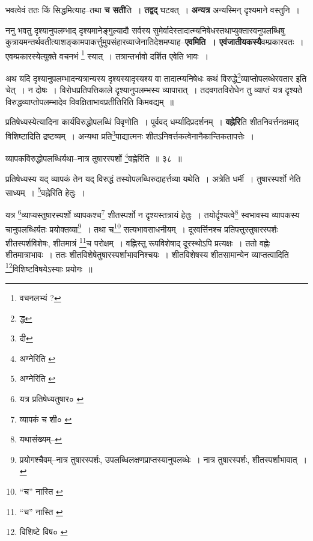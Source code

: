 \documentclass[article,12pt,a4paper]{memoir}
\begin{document}
	  \pstart भवत्वेवं ततः किं सिद्धमित्याह--तथा \textbf{च सती}ति । \textbf{तद्वद्} घटवत् । \textbf{अन्य}\leavevmode{}\textbf{त्र} अन्यस्मिन् दृश्यमाने वस्तुनि ।
	\pend
      

	  \pstart ननु भवतु दृश्यानुपलम्भाद् दृश्यमानेङ्गुल्यादौ सर्वस्य सुमेर्वादेस्तादात्म्यनिषेधस्तथाप्युक्तास्वनुपलब्धिषु कुत्रायमन्तर्थवतीत्याशङ्कामपाकर्त्तुमुपसंहारव्याजेनातिदेशमप्याह--\textbf{एवमिति । एवंजातीयकस्यै}वम्प्रकारवतः । एवम्प्रकारस्येत्युक्ते वचनभं \footnote{वचनलभ्यं ?} स्यात् । तत्रान्तर्भावो दर्शित एवेति भावः ।
	\pend
      

	  \pstart अथ यदि दृश्यानुपलम्भादन्यत्रान्यस्य दृश्यस्यादृस्यश्य वा तादात्म्यनिषेधः कथं विरुद्धे\footnote{द्ध}व्याप्तोपलब्धेरवतार इति चेत् । न दोषः । विरोधप्रतिपत्तिकाले दृश्यानुपलम्भस्य व्यापारात् । तदवगतविरोधेन तु व्याप्तं यत्र दृश्यते विरुद्धव्याप्तोपलम्भादेव विवक्षिताभावप्रतीतिरिति किमवद्यम् ॥
	\pend
      

	  \pstart प्रतिषेध्यस्येत्यादिना कार्यविरुद्धोपलब्धिं विवृणोति । पूर्ववद् धर्म्यादिप्रदर्शनम् । \textbf{वह्नेरि}ति शीतनिवर्त्तनक्षमाद् विशिष्टादिति द्रष्टव्यम् । अन्यथा प्रति\footnote{दी}पाद्यात्मनः शीतऽनिवर्त्तकत्वेनानैकान्तिकतापत्तेः ।
	\pend
      \leavevmode{}
	  \bigskip
	  \begingroup
	
	  \bigskip
	  \begingroup
	

	  \pstart व्यापकविरुद्धोपलब्धिर्यथा--नात्र तुषारस्पर्शो \footnote{अग्नेरिति \cite{dp-msB} \cite{dp-msC} \cite{dp-edP} \cite{dp-edH} \cite{dp-edN} \cite{dp-edE}}वह्नेरिति ॥ ३८ ॥
	\pend
      
	  \endgroup
	 

	  \pstart प्रतिषेध्यस्य यद् व्यापकं तेन यद् विरुद्धं तस्योपलब्धिरुदाहर्त्तव्या यथेति । अत्रेति धर्मी । तुषारस्पर्शो नेति साध्यम् । \footnote{अग्नेरिति \cite{dp-msD} \cite{dp-msB}}वह्नेरिति हेतुः ।
	\pend
       

	  \pstart यत्र \footnote{यत्र प्रतिषेध्यतुषार० \cite{dp-msC}}व्याप्यस्तुषारस्पर्शो व्यापकश्च\footnote{व्यापकं च शी० \cite{dp-msD}} शीतस्पर्शो न दृश्यस्तत्रायं हेतुः । तयोर्दृश्यत्वे\footnote{यथासंख्यम्--\cite{dp-msD-n}} स्वभावस्य व्यापकस्य चानुपलब्धिर्यतः प्रयोक्तव्या\footnote{प्रयोगश्चैवम्--नात्र तुषारस्पर्शः, उपलब्धिलक्षणप्राप्तस्यानुपलब्धेः । नात्र तुषारस्पर्शः, शीतस्पर्शाभावात् ।} । तथा च\footnote{“च” नास्ति \cite{dp-msB} \cite{dp-edP} \cite{dp-edE}} सत्यभावसाधनीयम् । दूरवर्त्तिनश्च प्रतिपत्तुस्तुषारस्पर्शः शीतस्पर्शविशेषः, शीतमात्रं \footnote{“च” नास्ति \cite{dp-msB}}च परोक्षम् । वह्निस्तु रूपविशेषाद् दूरस्थोऽपि प्रत्यक्षः । ततो वह्नेः शीतमात्राभावः । ततः शीतविशेषेतुषारस्पर्शाभावनिश्चयः । शीतविशेषस्य शीतसामान्येन व्याप्तत्वादिति \footnote{विशिष्टे विष० \cite{dp-msB}}विशिष्टविषयेऽस्याः प्रयोगः ॥
	\pend
       
\end{document}
